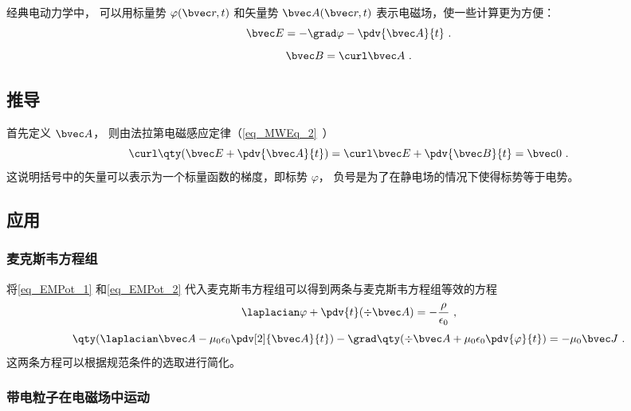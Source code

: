 
\begin{issues}
\issueDraft
\end{issues}


经典电动力学中， 可以用标量势 $\varphi(\bvec r, t)$ 和矢量势 $\bvec A(\bvec r, t)$ 表示电磁场，使一些计算更为方便：
\begin{equation}\label{eq_EMPot_1}
\bvec E = -\grad \varphi - \pdv{\bvec A}{t}~.
\end{equation}
\begin{equation}\label{eq_EMPot_2}
\bvec B = \curl \bvec A~.
\end{equation}

\subsection{推导}
首先定义 $\bvec A$， 则由法拉第电磁感应定律（\autoref{eq_MWEq_2}~）
\begin{equation}
\curl \qty(\bvec E + \pdv{\bvec A}{t}) = \curl \bvec E + \pdv{\bvec B}{t} = \bvec 0~.
\end{equation}
这说明括号中的矢量可以表示为一个标量函数的梯度，即标势 $\varphi$， 负号是为了在静电场的情况下使得标势等于电势。
\subsection{应用}
\subsubsection{麦克斯韦方程组}
将\autoref{eq_EMPot_1} 和\autoref{eq_EMPot_2} 代入麦克斯韦方程组可以得到两条与麦克斯韦方程组等效的方程
\begin{equation}\label{eq_EMPot_4}
\laplacian \varphi + \pdv{t} (\div \bvec A) = -\frac{\rho}{\epsilon_0}~,
\end{equation}
\begin{equation}\label{eq_EMPot_5}
\qty(\laplacian \bvec A - \mu_0\epsilon_0 \pdv[2]{\bvec A}{t}) - \grad \qty(\div \bvec A + \mu_0\epsilon_0 \pdv{\varphi}{t}) = -\mu_0\bvec J~.
\end{equation}
这两条方程可以根据规范条件的选取进行简化。
\subsubsection{带电粒子在电磁场中运动}

